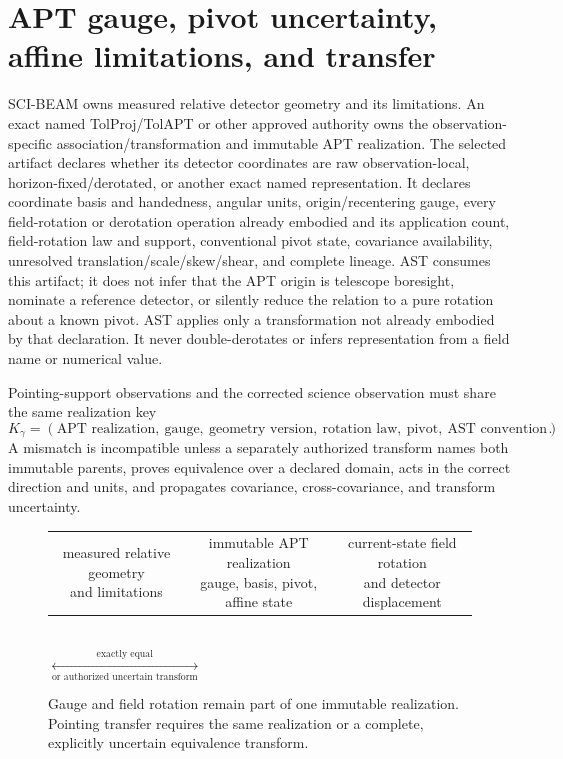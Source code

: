 \documentclass[10pt]{article}
\begin{document}
\newpage
\section{APT gauge, pivot uncertainty, affine limitations, and transfer}
SCI-BEAM owns measured relative detector geometry and its limitations. An
exact named TolProj/TolAPT or other approved authority owns the
observation-specific association/transformation and immutable APT realization.
The selected artifact declares whether its detector coordinates are raw
observation-local, horizon-fixed/derotated, or another exact named
representation. It declares coordinate basis and handedness, angular units,
origin/recentering gauge, every field-rotation or derotation operation already
embodied and its application count, field-rotation law and support, conventional pivot
state, covariance availability, unresolved translation/scale/skew/shear, and
complete lineage. AST consumes this artifact; it does not infer that the APT
origin is telescope boresight, nominate a reference detector, or silently
reduce the relation to a pure rotation about a known pivot. AST applies only a
transformation not already embodied by that declaration. It never
double-derotates or infers representation from a field name or numerical value.

Pointing-support observations and the corrected science observation must share
the same realization key
\begin{equation*}
 K_\gamma=(\text{APT realization},\ \text{gauge},\ \text{geometry version},
 \ \text{rotation law},\ \text{pivot},\ \text{AST convention}).
\end{equation*}
A mismatch is incompatible unless a separately authorized transform names
both immutable parents, proves equivalence over a declared domain, acts in the
correct direction and units, and propagates covariance, cross-covariance, and
transform uncertainty.

\begin{figure}[!ht]
\centering
\begin{tabular}{c@{\quad$\longrightarrow$\quad}c@{\quad$\longrightarrow$\quad}c}
\fcolorbox{astnavy}{astblue}{\parbox{0.23\linewidth}{\centering measured
relative geometry\\and limitations}} &
\fcolorbox{astnavy}{astgreen}{\parbox{0.28\linewidth}{\centering immutable APT
realization\\gauge, basis, pivot, affine state}} &
\fcolorbox{astnavy}{astgold}{\parbox{0.23\linewidth}{\centering current-state
field rotation\\and detector displacement}}
\end{tabular}\\[12pt]
\quad
$\underset{\text{or authorized uncertain transform}}{\overset{\text{exactly equal}}{\longleftrightarrow}}$\quad
{}
\caption{Gauge and field rotation remain part of one immutable realization.
Pointing transfer requires the same realization or a complete, explicitly
uncertain equivalence transform.}
\label{fig:gauge}
\end{figure}
\end{document}
